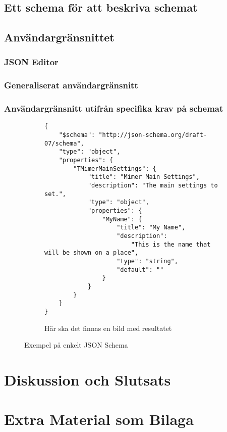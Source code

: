 \documentclass[swedish]{kththesis}
\begin{document}
\section{Ett schema för att beskriva schemat}

\section{Användargränsnittet}

\subsection{JSON Editor}

\subsection{Generaliserat användargränsnitt}

\subsection{Användargränsnitt utifrån specifika krav på schemat}
\begin{figure}
	\begin{subfigure}{\textwidth}
		\begin{verbatim}
{
	"$schema": "http://json-schema.org/draft-07/schema",
	"type": "object",
	"properties": {
		"TMimerMainSettings": {
			"title": "Mimer Main Settings",
			"description": "The main settings to set.",
			"type": "object",
			"properties": {
				"MyName": {
					"title": "My Name",
					"description":
						"This is the name that will be shown on a place",
					"type": "string",
					"default": ""
				}
			}
		}
	}
}
		\end{verbatim}
		\vspace{2em}
	\end{subfigure}
	\begin{subfigure}{\textwidth}
		Här ska det finnas en bild med resultatet
	\end{subfigure}
	\caption{Exempel på enkelt JSON Schema}
\end{figure}

\chapter{Diskussion och Slutsats}

\printbibliography[heading=bibintoc] %

\appendix

\chapter{Extra Material som Bilaga}
\end{document}
